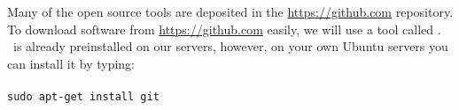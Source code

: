 Many of the open source tools are deposited in the \url{https://github.com} repository.
To download software from \url{https://github.com} easily, we will use a tool called \git.
\git~is already preinstalled on our servers, however, on your own Ubuntu servers
you can install it by typing:\\~\\
\texttt{sudo apt-get install git}\\










